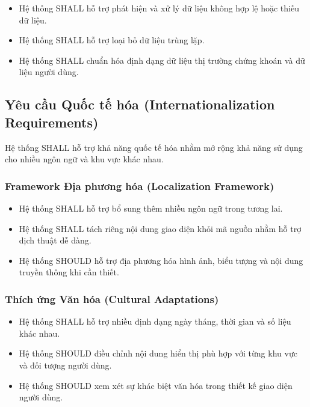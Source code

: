 \documentclass[12pt, a4paper]{article}
\begin{document}
\begin{itemize}
    \item Hệ thống SHALL hỗ trợ phát hiện và xử lý dữ liệu không hợp lệ hoặc thiếu dữ liệu.

    \item Hệ thống SHALL hỗ trợ loại bỏ dữ liệu trùng lặp.

    \item Hệ thống SHALL chuẩn hóa định dạng dữ liệu thị trường chứng khoán và dữ liệu người dùng.
\end{itemize}

\subsection{Yêu cầu Quốc tế hóa (Internationalization Requirements)}

Hệ thống SHALL hỗ trợ khả năng quốc tế hóa nhằm mở rộng khả năng sử dụng cho nhiều ngôn ngữ và khu vực khác nhau.

\subsubsection{Framework Địa phương hóa (Localization Framework)}

\begin{itemize}
    \item Hệ thống SHALL hỗ trợ bổ sung thêm nhiều ngôn ngữ trong tương lai.

    \item Hệ thống SHALL tách riêng nội dung giao diện khỏi mã nguồn nhằm hỗ trợ dịch thuật dễ dàng.

    \item Hệ thống SHOULD hỗ trợ địa phương hóa hình ảnh, biểu tượng và nội dung truyền thông khi cần thiết.
\end{itemize}

\subsubsection{Thích ứng Văn hóa (Cultural Adaptations)}

\begin{itemize}
    \item Hệ thống SHALL hỗ trợ nhiều định dạng ngày tháng, thời gian và số liệu khác nhau.

    \item Hệ thống SHOULD điều chỉnh nội dung hiển thị phù hợp với từng khu vực và đối tượng người dùng.

    \item Hệ thống SHOULD xem xét sự khác biệt văn hóa trong thiết kế giao diện người dùng.
\end{itemize}
\end{document}
